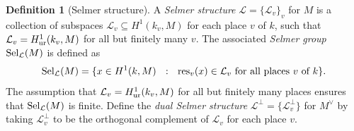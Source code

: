 \documentclass[10pt]{amsart}
\numberwithin{equation}{section}
\theoremstyle{remark}
\theoremstyle{definition}
\newtheorem{example}[equation]{Example}
\theoremstyle{definition}
\theoremstyle{definition}
\newtheorem{defi}[equation]{Definition}
\theoremstyle{definition}
\theoremstyle{definition}
\theoremstyle{definition}
\theoremstyle{definition}
\theoremstyle{definition}
\begin{document}
 

\begin{defi}[Selmer structure]
A \textit{Selmer structure} $\mathcal{L}=\{\mathcal{L}_v\}_{v}$ for $M$ is a collection of subspaces $\mathcal{L}_v\subseteq H^1(k_v,M)$ for each place $v$ of $k$, such that $\mathcal{L}_v=H^1_\textup{ur}(k_v,M)$ for all but finitely many $v$. The associated \textit{Selmer group} $\textup{Sel}_\mathcal{L}(M)$ is defined as
\[ \textup{Sel}_\mathcal{L}(M)=\{x\in H^1(k,M)~~:~~\textup{res}_v(x)\in \mathcal{L}_v \textup{ for all places }v\textup{ of }k\}.\]
The assumption that  $\mathcal{L}_v=H^1_\textup{ur}(k_v,M)$ for all but finitely many places ensures that $\textup{Sel}_\mathcal{L}(M)$ is finite.  
Define the \textit{dual Selmer structure} $\mathcal{L}^\perp=\{\mathcal{L}_v^\perp\}$ for $M^\vee$ by  taking $\mathcal{L}_v^\perp$ to be the orthogonal complement of $\mathcal{L}_v$ for each place $v$. %
\end{defi}
 
\end{document}
